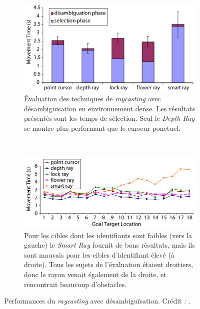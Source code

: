	\begin{figure}[!htb]
		\begin{subfigure}[t]{0.49\textwidth}
			\centering
			\includegraphics[width=\textwidth]{figures/ch2/rayTimes}
			\caption{Évaluation des techniques de \emph{raycasting} avec désambiguïsation en environnement dense. Les résultats présentés sont les temps de sélection. Seul le \emph{Depth Ray} se montre plus performant que le curseur ponctuel.}
			\label{fig:rayTimes}
		\end{subfigure}
		~
		\begin{subfigure}[t]{0.49\textwidth}
			\centering
			\includegraphics[width=\textwidth]{figures/ch2/smartRayLocation}
			\caption{Pour les cibles dont les identifiants sont faibles (vers la gauche) le \emph{Smart Ray} fournit de bons résultats, mais ils sont mauvais pour les cibles d'identifiant élevé (à droite). Tous les sujets de l'évaluation étaient droitiers, donc le rayon venait également de la droite, et rencontrait beaucoup d'obstacles.}
			\label{fig:smartRayLocation}
		\end{subfigure}
		\caption[Performances du \emph{raycasting} avec désambiguïsation]{Performances du \emph{raycasting} avec désambiguïsation. Crédit : \cite{grossman2006design}.}
		\label{fig:rayPerf}
	\end{figure}

